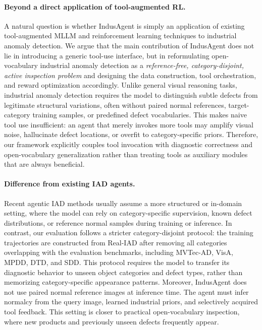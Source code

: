 \documentclass{llmxive}
\begin{document}
{\paragraph{Beyond a direct application of tool-augmented RL.}
A natural question is whether IndusAgent is simply an application of existing tool-augmented MLLM and reinforcement learning techniques to industrial anomaly detection. 
We argue that the main contribution of IndusAgent does not lie in introducing a generic tool-use interface, but in reformulating open-vocabulary industrial anomaly detection as a \emph{reference-free, category-disjoint, active inspection problem} and designing the data construction, tool orchestration, and reward optimization accordingly. 
Unlike general visual reasoning tasks, industrial anomaly detection requires the model to distinguish subtle defects from legitimate structural variations, often without paired normal references, target-category training samples, or predefined defect vocabularies. 
This makes naive tool use insufficient: an agent that merely invokes more tools may amplify visual noise, hallucinate defect locations, or overfit to category-specific priors. 
Therefore, our framework explicitly couples tool invocation with diagnostic correctness and open-vocabulary generalization rather than treating tools as auxiliary modules that are always beneficial.

\paragraph{Difference from existing IAD agents.}
Recent agentic IAD methods usually assume a more structured or in-domain setting, where the model can rely on category-specific supervision, known defect distributions, or reference normal samples during training or inference. 
In contrast, our evaluation follows a stricter category-disjoint protocol: the training trajectories are constructed from Real-IAD after removing all categories overlapping with the evaluation benchmarks, including MVTec-AD, VisA, MPDD, DTD, and SDD. 
This protocol requires the model to transfer its diagnostic behavior to unseen object categories and defect types, rather than memorizing category-specific appearance patterns. 
Moreover, IndusAgent does not use paired normal reference images at inference time. 
The agent must infer normalcy from the query image, learned industrial priors, and selectively acquired tool feedback. 
This setting is closer to practical open-vocabulary inspection, where new products and previously unseen defects frequently appear.

}
\end{document}
